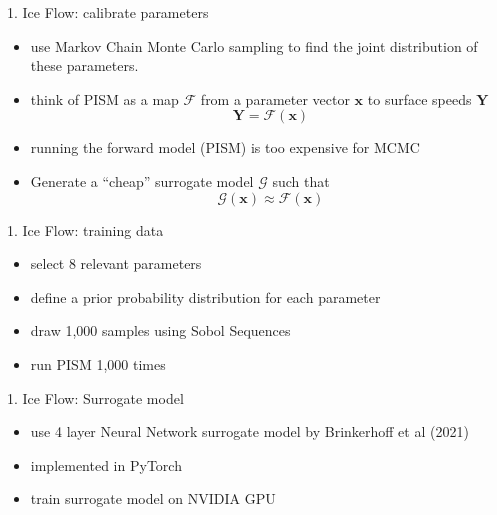 \documentclass[hide notes,intlimits]{beamer}
\begin{document}
\begin{frame}{1. Ice Flow: calibrate parameters}
\begin{itemize}
\item use Markov Chain Monte Carlo sampling to find the joint distribution of these parameters.
\item think of PISM as a map $\mathcal{F}$ from a parameter vector $\mathbf{x}$ to surface speeds $\mathbf{Y}$
\begin{equation}
\mathbf{Y} = \mathcal{F}(\mathbf{x})
\end{equation}
\item running the forward model (PISM) is too expensive for MCMC
\item Generate a ``cheap'' surrogate model $\mathcal{G}$ such that
\begin{equation}
\mathcal{G}(\mathbf{x}) \approx \mathcal{F}(\mathbf{x})
\end{equation}
\end{itemize}

\end{frame}

\begin{frame}{1. Ice Flow: training data}
\begin{itemize}
\item select 8 relevant parameters
\item define a prior probability distribution for each parameter
\item draw 1,000 samples using Sobol Sequences
\item run PISM 1,000 times
\end{itemize}
\end{frame}

\begin{frame}{1. Ice Flow: Surrogate model}
\begin{itemize}
\item use 4 layer Neural Network surrogate model by Brinkerhoff et al (2021)
\item implemented in PyTorch
\item train surrogate model on NVIDIA GPU
\end{itemize}
\end{frame}
\end{document}
